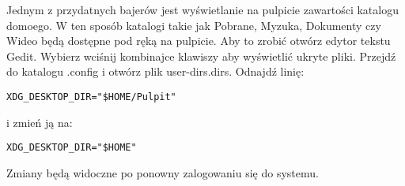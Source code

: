 Jednym z przydatnych bajerów jest wyświetlanie na pulpicie zawartości katalogu domoego. W ten sposób katalogi takie jak Pobrane, Myzuka, Dokumenty czy Wideo będą dostępne pod ręką na pulpicie. Aby to zrobić otwórz edytor tekstu Gedit. Wybierz  wciśnij kombinajce klawiszy  aby wyświetlić ukryte pliki. Przejdź do katalogu .config i otwórz plik \textcolor{ubuntu_orange}{user-dirs.dirs}. Odnajdź linię:
\begin{lstlisting}
XDG_DESKTOP_DIR="$HOME/Pulpit"
\end{lstlisting}
i zmień ją na:
\begin{lstlisting}
XDG_DESKTOP_DIR="$HOME"
\end{lstlisting}

Zmiany będą widoczne po ponowny zalogowaniu się do systemu.
